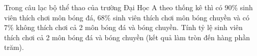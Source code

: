 \begin{bt}%

	Trong câu lạc bộ thể thao của trường Đại Học A theo thống kê thì có $90 \%$ sinh viên thích chơi môn bóng đá, $68 \%$ sinh viên thích chơi môn bóng chuyền và có $7 \%$ không thích chơi cả 2 môn bóng đá và bóng chuyền. Tính tỷ lệ sinh viên thích chơi cả 2 môn bóng đá và bóng chuyền (kết quả làm tròn đến hàng phần trăm).
\end{bt}

